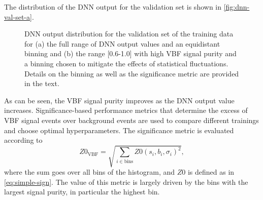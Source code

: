 The distribution of the DNN output for the validation set is shown in \cref{fig:dnn-val-set-a}.
\begin{figure}[ht]
    \caption{DNN output distribution for the validation set of the training data for (a) the full range of DNN output values and an equidistant binning and (b) the range [0.6-1.0] with high VBF signal purity and a binning chosen to mitigate the effects of statistical fluctuations. Details on the binning as well as the significance metric are provided in the text.}
    \label{fig:dnn-val-set}
\end{figure}
As can be seen, the VBF signal purity improves as the DNN output value increases.
Significance-based performance metrics that determine the excess of VBF signal events over background events are used to compare different trainings and choose optimal hyperparameters.
The significance metric is evaluated according to
\begin{equation}
    \label{eq:significance-performance-metric}
    Z0_{\mathrm{VBF}} = \sqrt{ \sum_{i \in \text{bins}} Z0(s_{i}, b_{i}, \sigma_{i})^2 },
\end{equation}
where the sum goes over all bins of the histogram, and $Z0$ is defined as in \cref{eq:simple-sign}.
The value of this metric is largely driven by the bins with the largest signal purity, in particular the highest bin.

